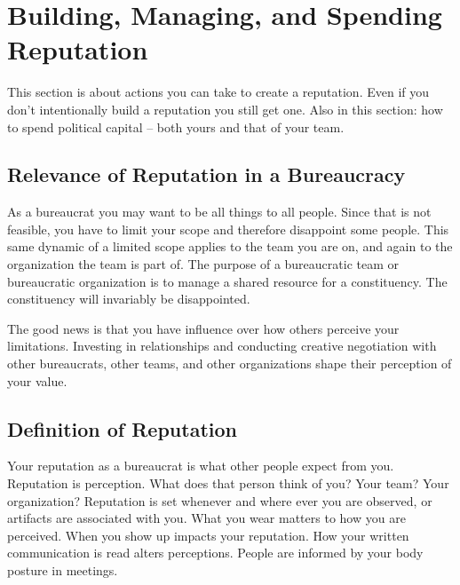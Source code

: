 \section{Building, Managing, and Spending Reputation\label{sec:reputation}}




This section is about actions you can take to create a reputation. Even if you don't intentionally build a reputation you still get one. Also in this section: how to spend political capital -- both yours and that of your team. 

\subsection*{Relevance of Reputation in a Bureaucracy}

As a bureaucrat you may want to be all things to all people. Since that is not feasible, you have to limit your scope and therefore disappoint some people. This same dynamic of a limited scope applies to the team you are on, and again to the organization the team is part of. The purpose of a bureaucratic team or bureaucratic organization is to manage a shared resource for a constituency. The constituency will invariably be disappointed. 

The good news is that you have influence over how others perceive your limitations. Investing in relationships and conducting creative negotiation with other bureaucrats, other teams, and other organizations shape their perception of your value. 

\subsection*{Definition of Reputation}

Your \gls{reputation} as a bureaucrat is what other people expect from you.
Reputation is perception. What does that person think of you? Your team? Your organization? 
Reputation is set whenever and where ever you are observed, or artifacts are associated with you. 
What you wear matters to how you are perceived. When you show up impacts your reputation. How your written communication is read alters perceptions. People are informed by your body posture in meetings. 

